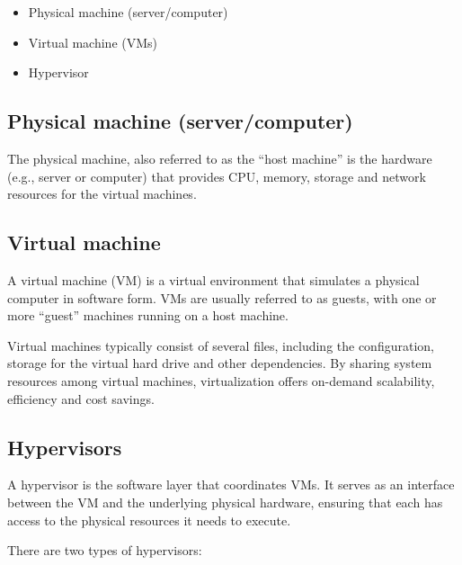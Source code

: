 \begin{itemize}

    \item Physical machine (server/computer)

    \item Virtual machine (VMs)

    \item Hypervisor

\end{itemize}

\subsection{Physical machine (server/computer)}
The physical machine, also referred to as the “host machine” is the hardware (e.g., server or computer) that provides CPU,
memory, storage and network resources for the virtual machines.

\subsection{Virtual machine}
A virtual machine (VM) is a virtual environment that simulates a physical computer in software form. VMs are usually referred to as guests, with one or more “guest” machines running on a host machine.

Virtual machines typically consist of several files, including the configuration, storage for the virtual hard drive and other dependencies. By sharing system resources among virtual machines, virtualization offers on-demand scalability, efficiency and cost savings.

\subsection{Hypervisors}
A hypervisor is the software layer that coordinates VMs. It serves as an interface between the VM and the underlying physical hardware, ensuring that each has access to the physical resources it needs to execute.


\vspace{0.5 cm}

There are two types of hypervisors:

